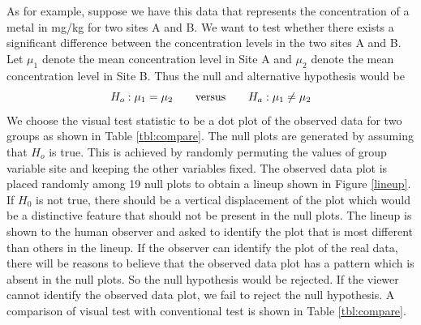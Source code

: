 As for example, suppose we have this data that represents the concentration of a metal in mg/kg for two sites A and B.
We want to test whether there exists a significant difference between the concentration levels in the two sites A and B. Let $\mu_1$ denote the mean concentration level in Site A and $\mu_2$ denote the mean concentration level in Site B. Thus the null and alternative hypothesis would be
\[
H_o: \mu_1 = \mu_2 \qquad \hbox{versus} \qquad H_a: \mu_1 \ne \mu_2
\]
We choose the visual test statistic to be a dot plot of the observed data for two groups as shown in Table \ref{tbl:compare}. The null plots are generated by assuming that $H_o$ is true. This is achieved by randomly permuting the values of group variable site and keeping the other variables fixed. The observed data plot is placed randomly among 19 null plots to obtain a lineup shown in Figure \ref{lineup}. If $H_0$ is not true, there should be a vertical displacement of the plot which would be a distinctive feature that should not be present in the null plots. The lineup is shown to the human observer and asked to identify the plot that is most different than others in the lineup. If the observer can identify the plot of the real data, there will be reasons to believe that the observed data plot has a pattern which is absent in the null plots. So the null hypothesis would be rejected. If the viewer cannot identify the observed data plot, we fail to reject the null hypothesis. A comparison of visual test with conventional test is shown in Table \ref{tbl:compare}.

